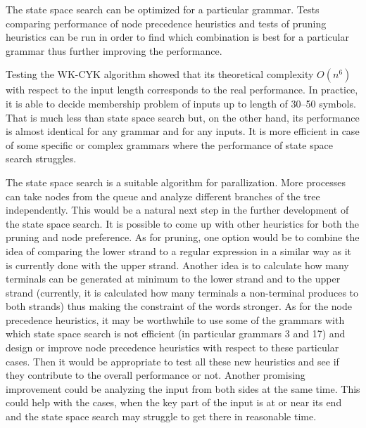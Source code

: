 The state space search can be optimized for a particular grammar. Tests comparing performance of node precedence heuristics and tests of pruning heuristics can be run in order to find which combination is best for a particular grammar thus further improving the performance.

Testing the WK-CYK algorithm showed that its theoretical complexity $O(n^6)$ with respect to the input length corresponds to the real performance. In practice, it is able to decide membership problem of inputs up to length of 30--50 symbols. That is much less than state space search but, on the other hand, its performance is almost identical for any grammar and for any inputs. It is more efficient in case of some specific or complex grammars where the performance of state space search struggles.

The state space search is a suitable algorithm for parallization. More processes can take nodes from the queue and analyze different branches of the tree independently. This would be a natural next step in the further development of the state space search.
It is possible to come up with other heuristics for both the pruning and node preference. As for pruning, one option would be to combine the idea of comparing the lower strand to a regular expression in a similar way as it is currently done with the upper strand. Another idea is to calculate how many terminals can be generated at minimum to the lower strand and to the upper strand (currently, it is calculated how many terminals a non-terminal produces to both strands) thus making the constraint of the words stronger.
As for the node precedence heuristics, it may be worthwhile to use some of the grammars with which state space search is not efficient (in particular grammars 3 and 17) and design or improve node precedence heuristics with respect to these particular cases. Then it would be appropriate to test all these new heuristics and see if they contribute to the overall performance or not.
Another promising improvement could be analyzing the input from both sides at the same time. This could help with the cases, when the key part of the input is at or near its end and the state space search may struggle to get there in reasonable time.
